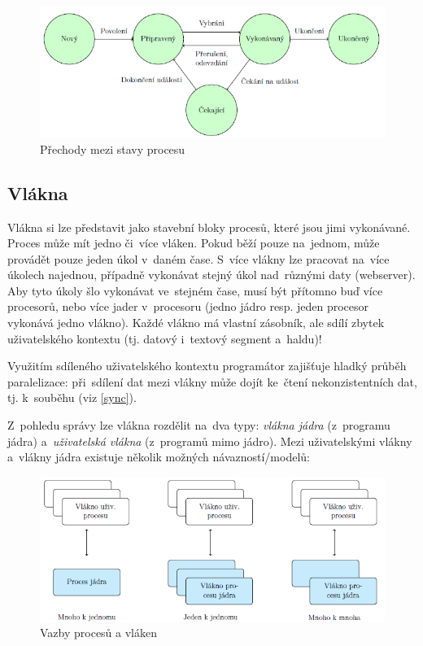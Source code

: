 \begin{figure}
	\centering
	\includegraphics[scale=1]{images/proc_states.png}
	\caption{Přechody mezi stavy procesu}
	\label{proc_states}
\end{figure}

\subsection{Vlákna}

Vlákna si lze představit jako stavební bloky procesů, které jsou jimi vykonávané. Proces může mít jedno či~více vláken. Pokud běží pouze na~jednom, může provádět pouze jeden úkol v~daném čase. S~více vlákny lze pracovat na~více úkolech najednou, případně vykonávat stejný úkol nad~různými daty (webserver). Aby tyto úkoly šlo vykonávat ve~stejném čase, musí být přítomno buď více procesorů, nebo více jader v~procesoru (jedno jádro resp. jeden procesor vykonává jedno vlákno). Každé vlákno má vlastní zásobník, ale sdílí zbytek uživatelského kontextu (tj. datový i~textový segment a~haldu)!

Využitím sdíleného uživatelského kontextu programátor zajišťuje hladký průběh paralelizace: při~sdílení dat mezi vlákny může dojít ke~čtení nekonzistentních dat, tj. k~souběhu (viz \ref{sync}).

Z~pohledu správy lze vlákna rozdělit na~dva typy: \emph{vlákna jádra} (z~programu jádra) a~\emph{uživatelská vlákna} (z~programů mimo jádro). Mezi uživatelskými vlákny a~vlákny jádra existuje několik možných návazností/modelů:

\begin{figure}[ht]
	\centering
	\includegraphics[scale=1]{images/thread_models.png}
	\caption{Vazby procesů a vláken}
	\label{thread_models}
\end{figure}

